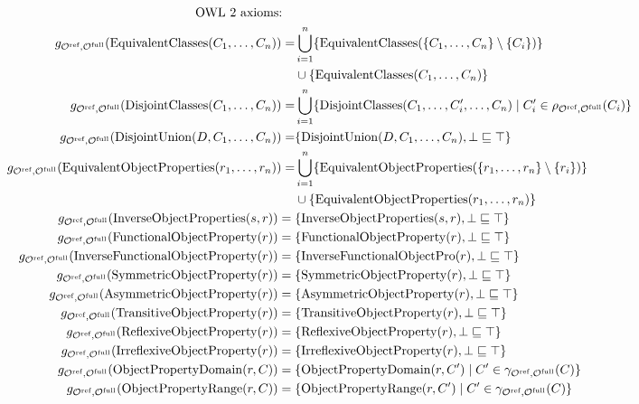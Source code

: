 {\begin{align*}
    \text{OWL 2 axioms:} \quad & \\
    g_{{\mathcal{O}^\textnormal{ref}},{\mathcal{O}^\textnormal{full}}}(\mathrm{EquivalentClasses}(C_1, \dots, C_n)) =& \bigcup_{i=1}^n \{ \mathrm{EquivalentClasses}(\{C_1, \dots, C_n\} \setminus \{C_i\}) \} \\& \cup \{ \mathrm{EquivalentClasses}(C_1, \dots, C_n) \} \\
    g_{{\mathcal{O}^\textnormal{ref}},{\mathcal{O}^\textnormal{full}}}(\mathrm{DisjointClasses}(C_1, \dots, C_n)) =& \bigcup_{i=1}^n \{ \mathrm{DisjointClasses}(C_1, \dots, C_i', \dots, C_n) \mid C_i' \in \rho_{{\mathcal{O}^\textnormal{ref}},{\mathcal{O}^\textnormal{full}}}(C_i) \} \\
    g_{{\mathcal{O}^\textnormal{ref}},{\mathcal{O}^\textnormal{full}}}(\mathrm{DisjointUnion}(D, C_1, \dots, C_n)) =& \{ \mathrm{DisjointUnion}(D, C_1, \dots, C_n), \bot \sqsubseteq \top \} \\
    g_{{\mathcal{O}^\textnormal{ref}},{\mathcal{O}^\textnormal{full}}}(\mathrm{EquivalentObjectProperties}(r_1, \dots, r_n)) =& \bigcup_{i=1}^n \{ \mathrm{EquivalentObjectProperties}(\{r_1, \dots, r_n\} \setminus \{r_i\}) \} \\& \cup \{ \mathrm{EquivalentObjectProperties}(r_1, \dots, r_n) \} \\
    g_{{\mathcal{O}^\textnormal{ref}},{\mathcal{O}^\textnormal{full}}}(\mathrm{InverseObjectProperties}(s, r)) ={} & \{ \mathrm{InverseObjectProperties}(s, r), \bot \sqsubseteq \top \} \\
    g_{{\mathcal{O}^\textnormal{ref}},{\mathcal{O}^\textnormal{full}}}(\mathrm{FunctionalObjectProperty}(r)) ={} & \{ \mathrm{FunctionalObjectProperty}(r), \bot \sqsubseteq \top \} \\
    g_{{\mathcal{O}^\textnormal{ref}},{\mathcal{O}^\textnormal{full}}}(\mathrm{InverseFunctionalObjectProperty}(r)) ={} & \{ \mathrm{InverseFunctionalObjectPro}(r), \bot \sqsubseteq \top \} \\
    g_{{\mathcal{O}^\textnormal{ref}},{\mathcal{O}^\textnormal{full}}}(\mathrm{SymmetricObjectProperty}(r)) ={} & \{ \mathrm{SymmetricObjectProperty}(r), \bot \sqsubseteq \top \} \\
    g_{{\mathcal{O}^\textnormal{ref}},{\mathcal{O}^\textnormal{full}}}(\mathrm{AsymmetricObjectProperty}(r)) ={} & \{ \mathrm{AsymmetricObjectProperty}(r), \bot \sqsubseteq \top \} \\
    g_{{\mathcal{O}^\textnormal{ref}},{\mathcal{O}^\textnormal{full}}}(\mathrm{TransitiveObjectProperty}(r)) ={} & \{ \mathrm{TransitiveObjectProperty}(r), \bot \sqsubseteq \top \} \\
    g_{{\mathcal{O}^\textnormal{ref}},{\mathcal{O}^\textnormal{full}}}(\mathrm{ReflexiveObjectProperty}(r)) ={} & \{ \mathrm{ReflexiveObjectProperty}(r), \bot \sqsubseteq \top \} \\
    g_{{\mathcal{O}^\textnormal{ref}},{\mathcal{O}^\textnormal{full}}}(\mathrm{IrreflexiveObjectProperty}(r)) ={} & \{ \mathrm{IrreflexiveObjectProperty}(r), \bot \sqsubseteq \top \} \\
    g_{{\mathcal{O}^\textnormal{ref}},{\mathcal{O}^\textnormal{full}}}(\mathrm{ObjectPropertyDomain}(r, C)) ={} & \{\mathrm{ObjectPropertyDomain}(r, C') \mid C' \in \gamma_{{\mathcal{O}^\textnormal{ref}},{\mathcal{O}^\textnormal{full}}}  (C)\} \\
    g_{{\mathcal{O}^\textnormal{ref}},{\mathcal{O}^\textnormal{full}}}(\mathrm{ObjectPropertyRange}(r, C)) ={} & \{\mathrm{ObjectPropertyRange}(r, C') \mid C' \in \gamma_{{\mathcal{O}^\textnormal{ref}},{\mathcal{O}^\textnormal{full}}}  (C)\}
\end{align*}
}
